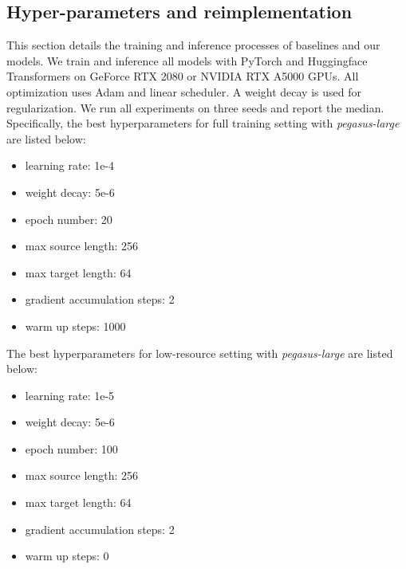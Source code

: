 \subsection{Hyper-parameters and reimplementation}\label{ssec:hyperparameter}

This section details the training and inference processes of baselines and our models. We train and inference all models with PyTorch and Huggingface Transformers on GeForce RTX 2080 or NVIDIA RTX A5000 GPUs. All optimization uses Adam and linear scheduler. A weight decay is used for regularization. We run all experiments on three seeds  and report the median.
Specifically, the best hyperparameters for full training setting with \emph{pegasus-large} are listed below:

\begin{itemize}[leftmargin=1em]
    \setlength\itemsep{0em}
    \item learning rate: 1e-4
    \item weight decay: 5e-6
    \item epoch number: 20
    \item max source length: 256
    \item max target length: 64
    \item gradient accumulation steps: 2
    \item warm up steps: 1000
\end{itemize}

The best hyperparameters for low-resource setting with \emph{pegasus-large} are listed below:

\begin{itemize}[leftmargin=1em]
    \setlength\itemsep{0em}
    \item learning rate: 1e-5
    \item weight decay: 5e-6
    \item epoch number: 100
    \item max source length: 256
    \item max target length: 64
    \item gradient accumulation steps: 2
    \item warm up steps: 0
\end{itemize}

